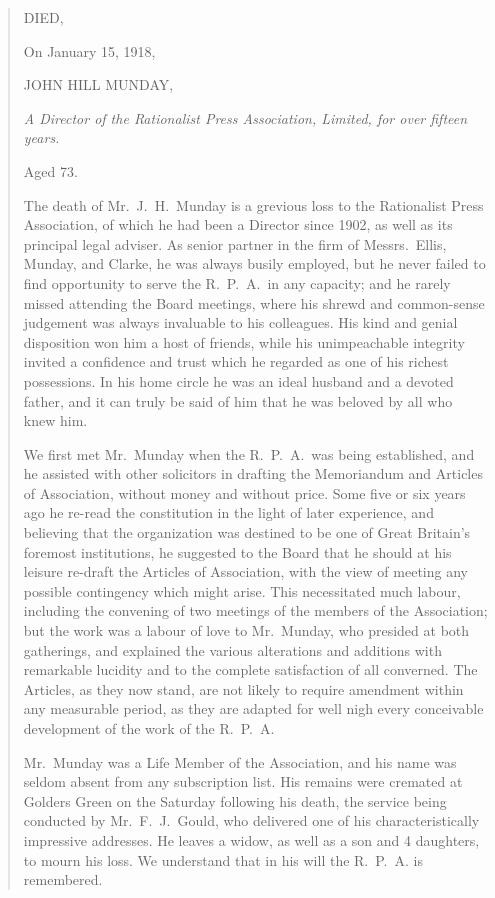 \begin{quotation}
\begin{center}
DIED,

On January 15, 1918,

JOHN HILL MUNDAY,

\emph{A Director of the Rationalist Press Association, Limited, for over fifteen years.}

Aged 73.
\end{center}

The death of Mr.\ J.\ H.\ Munday is a grevious loss to the Rationalist Press Association, of which he had been a Director since 1902, as well as its principal legal adviser. As senior partner in the firm of Messrs.\ Ellis, Munday, and Clarke, he was always busily employed, but he never failed to find opportunity to serve the R.~P.~A.~in any capacity; and he rarely missed attending the Board meetings, where his shrewd and common-sense judgement was always invaluable to his colleagues. His kind and genial disposition won him a host of friends, while his unimpeachable integrity invited a confidence and trust which he regarded as one of his richest possessions. In his home circle he was an ideal husband and a devoted father, and it can truly be said of him that he was beloved by all who knew him.

We first met Mr.\ Munday when the R.~P.~A.~was being established, and he assisted with other solicitors in drafting the Memoriandum and Articles of Association, without money and without price. Some five or six years ago he re-read the constitution in the light of later experience, and believing that the organization was destined to be one of Great Britain's foremost institutions, he suggested to the Board that he should at his leisure re-draft the Articles of Association, with the view of meeting any possible contingency which might arise. This necessitated much labour, including the convening of two meetings of the members of the Association; but the work was a labour of love to Mr.\ Munday, who presided at both gatherings, and explained the various alterations and additions with remarkable lucidity and to the complete satisfaction of all converned. The Articles, as they now stand, are not likely to require amendment within any measurable period, as they are adapted for well nigh every conceivable development of the work of the R.~P.~A.

Mr.\ Munday was a Life Member of the Association, and his name was seldom absent from any subscription list. His remains were cremated at Golders Green on the Saturday following his death, the service being conducted by Mr.~F.~J.~Gould, who delivered one of his characteristically impressive addresses. He leaves a widow, as well as a son and 4 daughters, to mourn his loss. We understand that in his will the R.~P.~A. is remembered.
\end{quotation}

